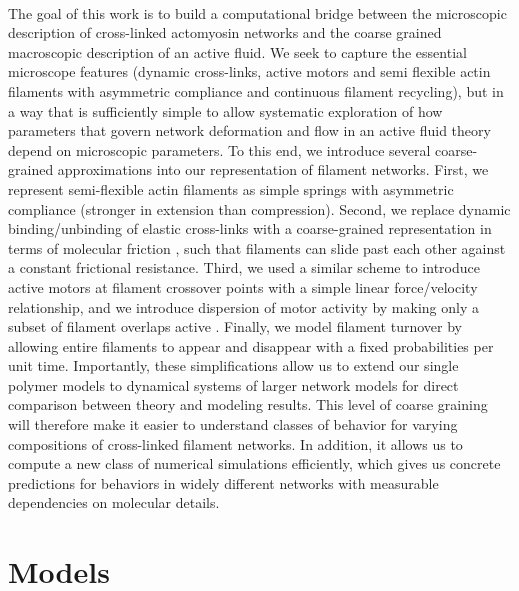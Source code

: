 \documentclass[10pt,letterpaper]{article}
\begin{document}
\paragraph{}  The goal of this work is to build a computational bridge between the microscopic description of cross-linked actomyosin networks and the coarse grained macroscopic description of an active fluid.  We seek to capture the essential microscope features (dynamic cross-links, active motors and semi flexible actin filaments with asymmetric compliance and continuous filament recycling), but in a way that is sufficiently simple to allow systematic exploration of how parameters that govern network deformation and flow in an active fluid theory depend on microscopic parameters. To this end, we introduce several coarse-grained approximations into our representation of filament networks. First, we represent semi-flexible actin filaments as simple springs with asymmetric compliance (stronger in extension than compression). Second, we replace  dynamic binding/unbinding of elastic cross-links with a coarse-grained representation in terms of molecular friction \cite{theo_friction,theo_frictionSam,theo_molefric}, such that filaments can slide past each other against a constant frictional resistance. Third, we used a similar scheme to introduce active motors at filament crossover points with a simple linear force/velocity relationship, and we introduce dispersion of motor activity by making only a subset of filament overlaps active \cite{theo_frictionShila}.  Finally, we model filament turnover by allowing entire filaments to appear and disappear with a fixed probabilities per unit time. Importantly, these simplifications allow us to extend our single polymer models to dynamical systems of larger network models for direct comparison between theory and modeling results. This level of coarse graining will therefore make it easier to understand classes of behavior for varying compositions of cross-linked filament networks. In addition, it allows us to compute a new class of numerical simulations efficiently, which gives us concrete predictions for behaviors in widely different networks with measurable dependencies on molecular details. 
  

\section*{Models}
\end{document}
